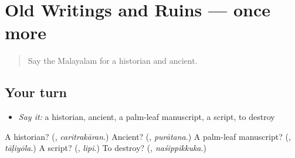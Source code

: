 \section[(dialogue)]{Old Writings and Ruins — once more}

\label{lesson:ML-R404-review-final-404}



\begin{quote}
Say the Malayalam for a historian and ancient.
\end{quote}

\subsection*{Your turn}
\begin{itemize}
\raggedright
  \item \emph{Say it:} a historian, ancient, a palm-leaf manuscript, a script, to destroy
\end{itemize}

\begin{tcolorbox}[breakable,colback=teal!4,colframe=teal!35!black,title={Before you move on}]
A historian? (\textbf{}, \emph{caritrakāran}.) Ancient? (\textbf{}, \emph{purātana}.) A palm-leaf manuscript? (\textbf{}, \emph{tāḷiyōla}.) A script? (\textbf{}, \emph{lipi}.) To destroy? (\textbf{}, \emph{naśippikkuka}.)
\end{tcolorbox}
